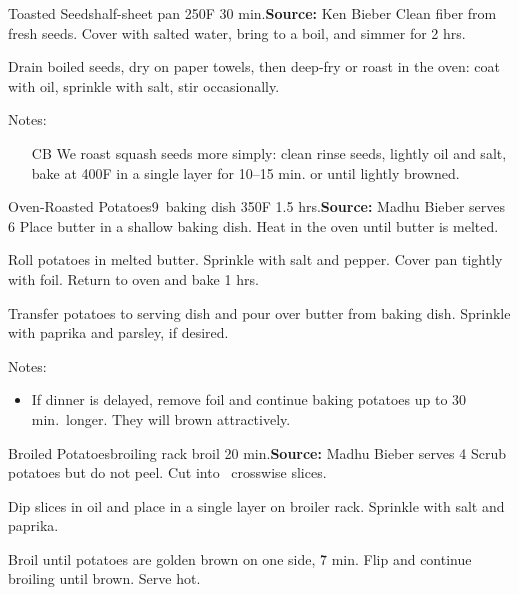 \begin{recipe}{Toasted Seeds}{half-sheet pan \hfill 250\0F \hfill 30 min.}{\textbf{Source:} Ken Bieber \hfill }
 Clean fiber from fresh seeds. Cover with salted water, bring to a boil, and simmer for 2 hrs.

 \newstep Drain boiled seeds, dry on paper towels, then deep-fry or roast in the oven: coat with oil, sprinkle with salt, stir occasionally.

 \freeform Notes:
 \begin{itemize}
  \item [CB] We roast squash seeds more simply: clean \And rinse seeds, lightly oil and salt, bake at 400\0F in a single layer for 10--15 min. or until lightly browned.
 \end{itemize}
\end{recipe}

\begin{recipe}{Oven-Roasted Potatoes}{9\inch{}\inch\ baking dish \hfill 350\0F \hfill 1.5 hrs.}{\textbf{Source:} Madhu Bieber \hfill serves 6}
 Place butter in a shallow baking dish. Heat in the oven until butter is melted.

 Roll potatoes in melted butter. Sprinkle with salt and pepper. Cover pan tightly with foil. Return to oven and bake 1 hrs.

 Transfer potatoes to serving dish and pour over butter from baking dish. Sprinkle with paprika and parsley, if desired.

 \freeform Notes:
 \begin{itemize}
  \item If dinner is delayed, remove foil and continue baking potatoes up to 30 min.\ longer. They will brown attractively.
 \end{itemize}
\end{recipe}

\begin{recipe}{Broiled Potatoes}{broiling rack \hfill broil \hfill 20 min.}{\textbf{Source:} Madhu Bieber \hfill serves 4}
 Scrub potatoes but do not peel. Cut into \inch\ crosswise slices.

 Dip slices in oil and place in a single layer on broiler rack. Sprinkle with salt and paprika.

 \newstep Broil until potatoes are golden brown on one side, \~7 min. Flip and continue broiling until brown. Serve hot.
\end{recipe}


